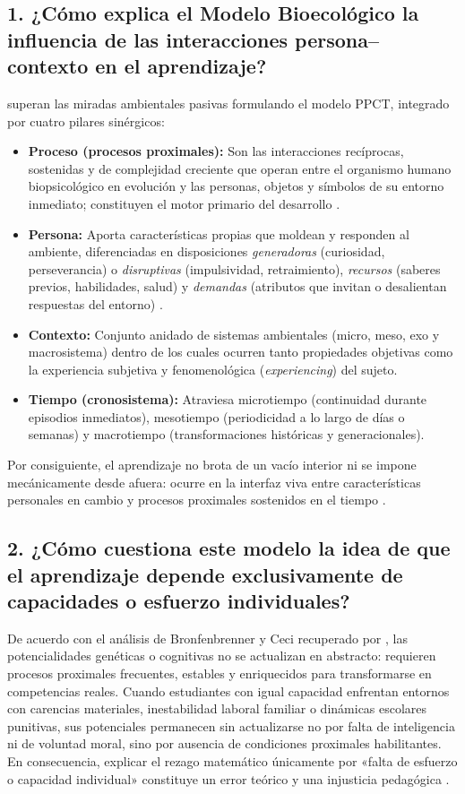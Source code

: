 \documentclass[spanish,letterpaper,oneside]{article}
\begin{document}
\subsection*{1. ¿Cómo explica el Modelo Bioecológico la influencia de las interacciones persona--contexto en el aprendizaje?}
\citet{bronfenbrenner2006bioecologico} superan las miradas ambientales pasivas formulando el modelo PPCT, integrado por cuatro pilares sinérgicos:
\begin{itemize}
  \item \textbf{Proceso (procesos proximales):} Son las interacciones recíprocas, sostenidas y de complejidad creciente que operan entre el organismo humano biopsicológico en evolución y las personas, objetos y símbolos de su entorno inmediato; constituyen el motor primario del desarrollo \citep{bronfenbrenner2006bioecologico}.
  \item \textbf{Persona:} Aporta características propias que moldean y responden al ambiente, diferenciadas en disposiciones \textit{generadoras} (curiosidad, perseverancia) o \textit{disruptivas} (impulsividad, retraimiento), \textit{recursos} (saberes previos, habilidades, salud) y \textit{demandas} (atributos que invitan o desalientan respuestas del entorno) \citep{bronfenbrenner2006bioecologico}.
  \item \textbf{Contexto:} Conjunto anidado de sistemas ambientales (micro, meso, exo y macrosistema) dentro de los cuales ocurren tanto propiedades objetivas como la experiencia subjetiva y fenomenológica (\textit{experiencing}) del sujeto.
  \item \textbf{Tiempo (cronosistema):} Atraviesa microtiempo (continuidad durante episodios inmediatos), mesotiempo (periodicidad a lo largo de días o semanas) y macrotiempo (transformaciones históricas y generacionales).
\end{itemize}
Por consiguiente, el aprendizaje no brota de un vacío interior ni se impone mecánicamente desde afuera: ocurre en la interfaz viva entre características personales en cambio y procesos proximales sostenidos en el tiempo \citep{tong2023bioecological}.

\subsection*{2. ¿Cómo cuestiona este modelo la idea de que el aprendizaje depende exclusivamente de capacidades o esfuerzo individuales?}
De acuerdo con el análisis de Bronfenbrenner y Ceci recuperado por \citet{bronfenbrenner2006bioecologico}, las potencialidades genéticas o cognitivas no se actualizan en abstracto: requieren procesos proximales frecuentes, estables y enriquecidos para transformarse en competencias reales. Cuando estudiantes con igual capacidad enfrentan entornos con carencias materiales, inestabilidad laboral familiar o dinámicas escolares punitivas, sus potenciales permanecen sin actualizarse no por falta de inteligencia ni de voluntad moral, sino por ausencia de condiciones proximales habilitantes. En consecuencia, explicar el rezago matemático únicamente por «falta de esfuerzo o capacidad individual» constituye un error teórico y una injusticia pedagógica \citep{unesco2015replantear}.
\end{document}
